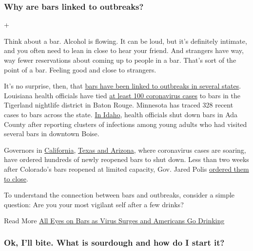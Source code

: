 \hypertarget{why-are-bars-linked-to-outbreaks}{%
\subsubsection{Why are bars linked to
outbreaks?}\label{why-are-bars-linked-to-outbreaks}}

+

Think about a bar. Alcohol is flowing. It can be loud, but it's
definitely intimate, and you often need to lean in close to hear your
friend. And strangers have way, way fewer reservations about coming up
to people in a bar. That's sort of the point of a bar. Feeling good and
close to strangers.

It's no surprise, then, that
\href{https://www.nytimes3xbfgragh.onion/2020/06/25/well/live/coronavirus-spread-bars-transmission.html}{bars
have been linked to outbreaks in several states}. Louisiana health
officials have tied
\href{https://www.nytimes3xbfgragh.onion/2020/06/22/us/new-coronavirus-phase.html}{at
least 100 coronavirus cases} to bars in the Tigerland nightlife district
in Baton Rouge. Minnesota has traced 328 recent cases to bars across the
state.
\href{https://www.boisestatepublicradio.org/post/bars-large-venues-close-ada-county-after-surge-coronavirus-prompts-rollback\#stream/0}{In
Idaho}, health officials shut down bars in Ada County after reporting
clusters of infections among young adults who had visited several bars
in downtown Boise.

Governors in
\href{https://www.nytimes3xbfgragh.onion/2020/07/01/us/california-coronavirus-reopening.html}{California},
\href{https://www.nytimes3xbfgragh.onion/2020/06/14/us/coronavirus-united-states.html}{Texas
and Arizona}, where coronavirus cases are soaring, have ordered hundreds
of newly reopened bars to shut down. Less than two weeks after
Colorado's bars reopened at limited capacity, Gov. Jared Polis
\href{https://www.denverpost.com/2020/06/30/colorado-bars-closed-coronavirus/}{ordered
them to close}.

To understand the connection between bars and outbreaks, consider a
simple question: Are you your most vigilant self after a few drinks?

Read More
\href{https://www.nytimes3xbfgragh.onion/2020/07/02/us/coronavirus-bars.html}{All
Eyes on Bars as Virus Surges and Americans Go Drinking}

\hypertarget{ok-ill-bite-what-is-sourdough-and-how-do-i-start-it}{%
\subsubsection{Ok, I'll bite. What is sourdough and how do I start
it?}\label{ok-ill-bite-what-is-sourdough-and-how-do-i-start-it}}

